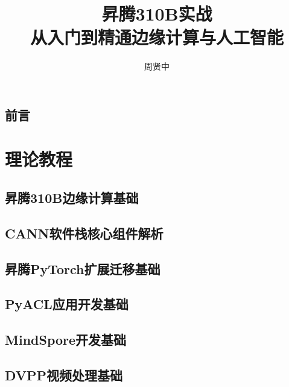 \documentclass[fontsize=10.5pt, paper=185mm:260mm, twoside=false, open=any]{scrbook}
\title{昇腾310B实战\\从入门到精通边缘计算与人工智能}
\author{周贤中}
\date{}
\theoremstyle{break}
\begin{document}
\hypersetup{pageanchor=false}
\maketitle

\frontmatter
\hypersetup{pageanchor=true}
\chapter*{前言}


\setcounter{tocdepth}{2}
\renewcommand{\contentsname}{目录} %

\tableofcontents

\mainmatter

\part{理论教程}

\chapter{昇腾310B边缘计算基础}


\chapter{CANN软件栈核心组件解析}


\chapter{昇腾PyTorch扩展迁移基础}


\chapter{PyACL应用开发基础}


\chapter{MindSpore开发基础}


\chapter{DVPP视频处理基础}

\end{document}
